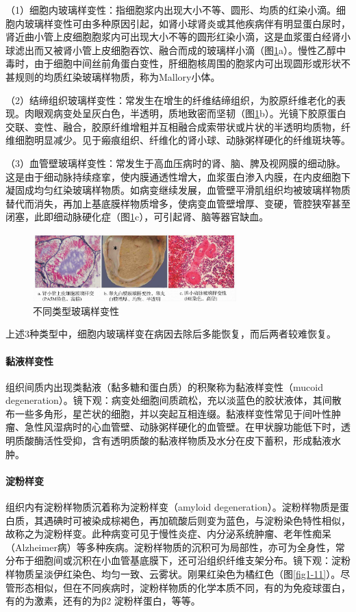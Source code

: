 （1）细胞内玻璃样变性：指细胞浆内出现大小不等、圆形、均质的红染小滴。细胞内玻璃样变性可由多种原因引起，如肾小球肾炎或其他疾病伴有明显蛋白尿时，肾近曲小管上皮细胞胞浆内可出现大小不等的圆形红染小滴，这是血浆蛋白经肾小球滤出而又被肾小管上皮细胞吞饮、融合而成的玻璃样小滴（图\ref{fig1-10}a）。慢性乙醇中毒时，由于细胞中间丝前角蛋白变性，肝细胞核周围的胞浆内可出现圆形或形状不甚规则的均质红染玻璃样物质，称为Mallory小体。

（2）结缔组织玻璃样变性：常发生在增生的纤维结缔组织，为胶原纤维老化的表现。肉眼观病变处呈灰白色，半透明，质地致密而坚韧（图\ref{fig1-10}b）。光镜下胶原蛋白交联、变性、融合，胶原纤维增粗并互相融合成索带状或片状的半透明均质物，纤维细胞明显减少。见于瘢痕组织、纤维化的肾小球、动脉粥样硬化的纤维斑块等。

（3）血管壁玻璃样变性：常发生于高血压病时的肾、脑、脾及视网膜的细动脉。这是由于细动脉持续痉挛，使内膜通透性增大，血浆蛋白渗入内膜，在内皮细胞下凝固成均匀红染玻璃样物质。如病变继续发展，血管壁平滑肌组织均被玻璃样物质替代而消失，再加上基底膜样物质增多，使病变血管壁增厚、变硬，管腔狭窄甚至闭塞，此即细动脉硬化症（图\ref{fig1-10}c），可引起肾、脑等器官缺血。
\begin{figure}[!htbp]
	\centering
	\includegraphics[width=0.7\textwidth]{./images/Image00011.jpg}
	\caption{不同类型玻璃样变性}
	\label{fig1-10}
\end{figure}

上述3种类型中，细胞内玻璃样变在病因去除后多能恢复，而后两者较难恢复。

\paragraph{黏液样变性}
组织间质内出现类黏液（黏多糖和蛋白质）的积聚称为黏液样变性（mucoid
degeneration）。镜下观：病变处细胞间质疏松，充以淡蓝色的胶状液体，其间散布一些多角形，星芒状的细胞，并以突起互相连缀。黏液样变性常见于间叶性肿瘤、急性风湿病时的心血管壁、动脉粥样硬化的血管壁。在甲状腺功能低下时，透明质酸酶活性受抑，含有透明质酸的黏液样物质及水分在皮下蓄积，形成黏液水肿。

\paragraph{淀粉样变}
组织内有淀粉样物质沉着称为淀粉样变（amyloid
degeneration）。淀粉样物质是蛋白质，其遇碘时可被染成棕褐色，再加硫酸后则变为蓝色，与淀粉染色特性相似，故称之为淀粉样变。此种病变可见于慢性炎症、内分泌系统肿瘤、老年性痴呆（Alzheimer病）等多种疾病。淀粉样物质的沉积可为局部性，亦可为全身性，常分布于细胞间或沉积在小血管基底膜下，还可沿组织纤维支架分布。镜下观：淀粉样物质呈淡伊红染色、均匀一致、云雾状。刚果红染色为橘红色（图\ref{fig1-11}）。尽管形态相似，但在不同疾病时，淀粉样物质的化学本质不同，有的为免疫球蛋白，有的为激素，还有的为β{2}
淀粉样蛋白，等等。

